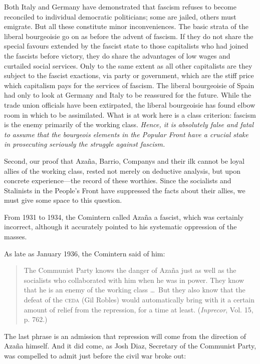 Both Italy and Germany have demonstrated that fascism refuses to become reconciled to individual democratic politicians; some are jailed, others must emigrate. But all these constitute minor inconveniences. The basic strata of the liberal bourgeoisie go on as before the advent of fascism. If they do not share the special favours extended by the fascist state to those capitalists who had joined the fascists before victory, they do share the advantages of low wages and curtailed social services. Only to the same extent as all other capitalists are they subject to the fascist exactions, via party or government, which are the stiff price which capitalism pays for the services of fascism. The liberal bourgeoisie of Spain had only to look at Germany and Italy to be reassured for the future. While the trade union officials have been extirpated, the liberal bourgeoisie has found elbow room in which to be assimilated.
What is at work here is a class criterion: fascism is the enemy primarily of the working class. \emph{Hence, it is absolutely false and fatal to assume that the bourgeois elements in the Popular Front have a crucial stake in prosecuting seriously the struggle against fascism.}

Second, our proof that Azaña, Barrio, Companys and their ilk cannot be loyal allies of the working class, rested not merely on deductive analysis, but upon concrete experience---the record of these worthies. Since the socialists and Stalinists in the People’s Front have suppressed the facts about their allies, we must give some space to this question.

From 1931 to 1934, the Comintern called Azaña{\indexMAzana} a fascist, which was certainly incorrect, although it accurately pointed to his systematic oppression of the masses.

As late as January 1936, the Comintern said of him:

\begin{quotation}
  The Communist Party knows the danger of Azaña just as well as the socialists who collaborated with him when he was in power. They know that he is an enemy of the working class \dots\ But they also know that the defeat of the \textsc{ceda} (Gil Robles) would automatically bring with it a certain amount of relief from the repression, for a time at least. (\emph{Inprecor}, Vol. 15, p. 762.)
\end{quotation}

The last phrase is an admission that repression will come from the direction of Azaña himself. And it did come, as Josh Diaz, Secretary of the Communist Party, was compelled to admit just before the civil war broke out:

